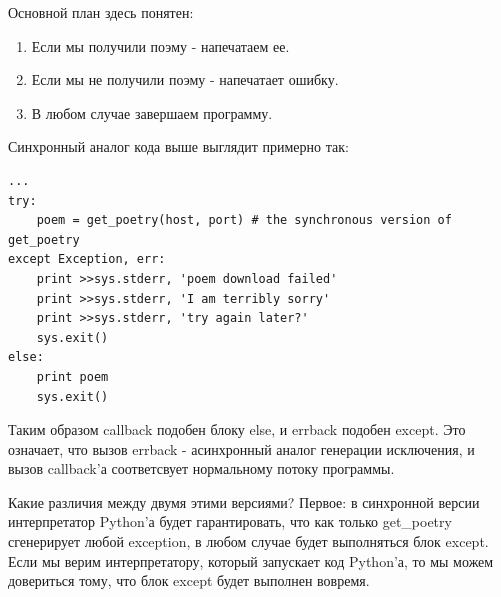 Основной план здесь понятен:

\begin{enumerate}
\item Если мы получили поэму - напечатаем ее.
\item Если мы не получили поэму - напечатает ошибку.
\item В любом случае завершаем программу.
\end{enumerate}

Синхронный аналог кода выше выглядит 
примерно так:

\begin{scriptsize}\begin{verbatim}
...
try:
    poem = get_poetry(host, port) # the synchronous version of get_poetry
except Exception, err:
    print >>sys.stderr, 'poem download failed'
    print >>sys.stderr, 'I am terribly sorry'
    print >>sys.stderr, 'try again later?'
    sys.exit()
else:
    print poem
    sys.exit()
\end{verbatim}\end{scriptsize}


Таким образом callback подобен блоку else, и errback 
подобен except. Это означает, что вызов errback - асинхронный 
аналог генерации исключения, и вызов callback'а соответсвует 
нормальному потоку программы. 


Какие различия между двумя этими версиями? 
Первое: в синхронной версии интерпретатор Python'а будет 
гарантировать, что как только get\_poetry сгенерирует любой 
exception, в любом случае будет выполняться блок except. 
Если мы верим интерпретатору, который запускает код Python'а, 
то мы можем довериться тому, что блок except будет выполнен вовремя.


